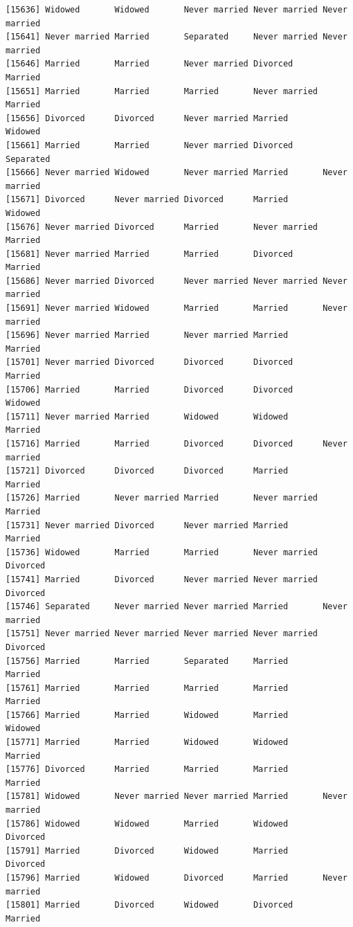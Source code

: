 \documentclass[
  letterpaper,
  DIV=11,
  numbers=noendperiod,
  oneside]{scrartcl}
\begin{document}
\begin{verbatim}
[15636] Widowed       Widowed       Never married Never married Never married
[15641] Never married Married       Separated     Never married Never married
[15646] Married       Married       Never married Divorced      Married      
[15651] Married       Married       Married       Never married Married      
[15656] Divorced      Divorced      Never married Married       Widowed      
[15661] Married       Married       Never married Divorced      Separated    
[15666] Never married Widowed       Never married Married       Never married
[15671] Divorced      Never married Divorced      Married       Widowed      
[15676] Never married Divorced      Married       Never married Married      
[15681] Never married Married       Married       Divorced      Married      
[15686] Never married Divorced      Never married Never married Never married
[15691] Never married Widowed       Married       Married       Never married
[15696] Never married Married       Never married Married       Married      
[15701] Never married Divorced      Divorced      Divorced      Married      
[15706] Married       Married       Divorced      Divorced      Widowed      
[15711] Never married Married       Widowed       Widowed       Married      
[15716] Married       Married       Divorced      Divorced      Never married
[15721] Divorced      Divorced      Divorced      Married       Married      
[15726] Married       Never married Married       Never married Married      
[15731] Never married Divorced      Never married Married       Married      
[15736] Widowed       Married       Married       Never married Divorced     
[15741] Married       Divorced      Never married Never married Divorced     
[15746] Separated     Never married Never married Married       Never married
[15751] Never married Never married Never married Never married Divorced     
[15756] Married       Married       Separated     Married       Married      
[15761] Married       Married       Married       Married       Married      
[15766] Married       Married       Widowed       Married       Widowed      
[15771] Married       Married       Widowed       Widowed       Married      
[15776] Divorced      Married       Married       Married       Married      
[15781] Widowed       Never married Never married Married       Never married
[15786] Widowed       Widowed       Married       Widowed       Divorced     
[15791] Married       Divorced      Widowed       Married       Divorced     
[15796] Married       Widowed       Divorced      Married       Never married
[15801] Married       Divorced      Widowed       Divorced      Married      

\end{verbatim}
\end{document}
